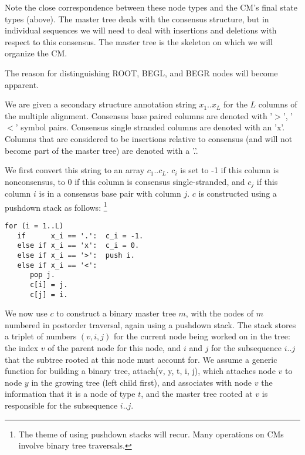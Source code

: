 \documentclass[11pt]{article}
\begin{document}
Note the close correspondence between these node types and the CM's
final state types (above). The master tree deals with the consensus
structure, but in individual sequences we will need to deal with
insertions and deletions with respect to this consensus. The master
tree is the skeleton on which we will organize the CM.

The reason for distinguishing ROOT, BEGL, and BEGR nodes will become
apparent.

We are given a secondary structure annotation string $x_1..x_L$ for
the $L$ columns of the multiple alignment. Consensus base paired
columns are denoted with '$>$', '$<$' symbol pairs. Consensus single
stranded columns are denoted with an 'x'. Columns that are considered
to be insertions relative to consensus (and will not become part of
the master tree) are denoted with a '.'.

We first convert this string to an array $c_1..c_L$. $c_i$ is set to
-1 if this column is nonconsensus, to 0 if this column is consensus
single-stranded, and $c_j$ if this column $i$ is in a consensus base
pair with column $j$. $c$ is constructed using a pushdown stack
as follows:
\footnote{The theme of using pushdown stacks will recur. Many operations
on CMs involve binary tree traversals.}

\begin{verbatim}
for (i = 1..L)
   if      x_i == '.':  c_i = -1.
   else if x_i == 'x':  c_i = 0.
   else if x_i == '>':  push i.
   else if x_i == '<':  
      pop j.
      c[i] = j.
      c[j] = i.
\end{verbatim}

We now use $c$ to construct a binary master tree $m$, with the nodes
of $m$ numbered in postorder traversal, again using a pushdown stack.
The stack stores a triplet of numbers $(v,i,j)$ for the current node
being worked on in the tree: the index $v$ of the parent node for this
node, and $i$ and $j$ for the subsequence $i..j$ that the subtree
rooted at this node must account for. We assume a generic function for
building a binary tree, attach(v, y, t, i, j), which attaches node $v$
to node $y$ in the growing tree (left child first), and associates
with node $v$ the information that it is a node of type $t$, and the
master tree rooted at $v$ is responsible for the subsequence $i..j$.
\end{document}
